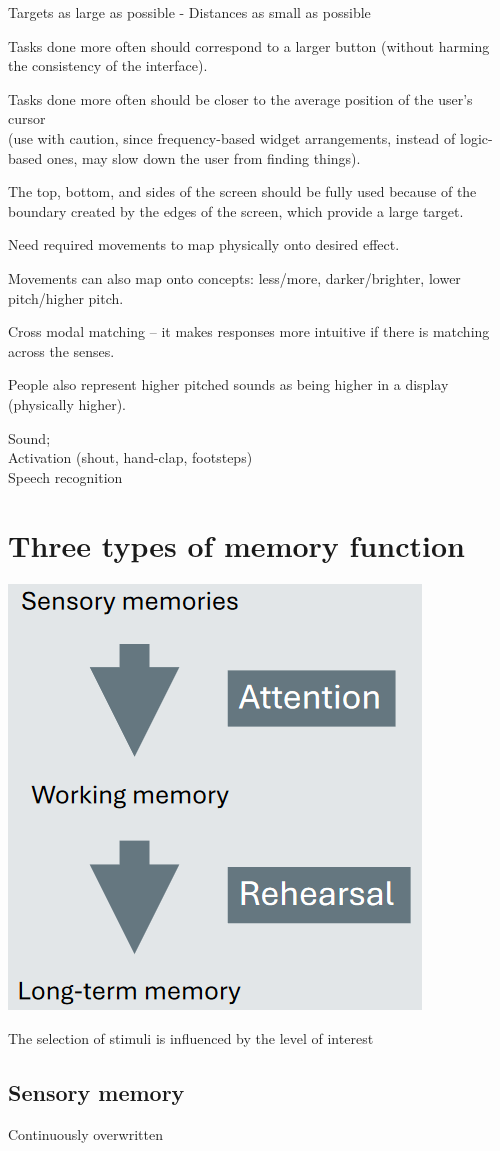 \documentclass[]{project_plan}
\begin{document}
Targets as large as possible - Distances as small as possible

Tasks done more often should correspond to a larger button (without harming the
consistency of the interface).

Tasks done more often should be closer to the average position of the user's cursor\\
(use with caution, since frequency-based widget arrangements, instead of logic-
based ones, may slow down the user from finding things).

The top, bottom, and sides of the screen should be fully used because of the
boundary created by the edges of the screen, which provide a large target.

Need required movements to map physically onto desired effect.

Movements can also map onto concepts: less/more, darker/brighter, lower pitch/higher pitch.

Cross modal matching – it makes responses more intuitive if there is matching across the senses.

People also represent higher pitched sounds as being higher in a display (physically higher).

Sound;\\
Activation (shout, hand-clap, footsteps)\\
Speech recognition

\section{Three types of memory function}
\includegraphics[width=0.5\linewidth]{types_of_memory_function.png}

The selection of stimuli is influenced by the level of interest

\subsection{Sensory memory}
Continuously overwritten
\end{document}
